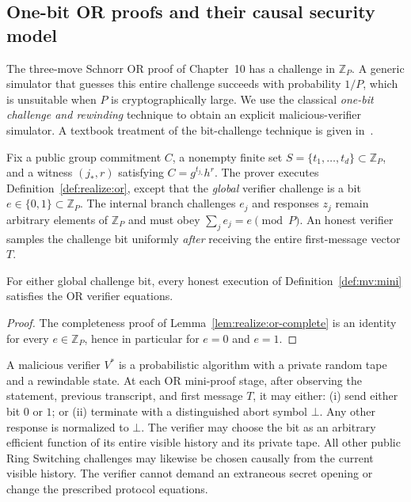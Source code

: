 \subsection{One-bit OR proofs and their causal security model}\label{sec:mv:bit}
The three-move Schnorr OR proof of Chapter~10 has a challenge
in $\mathbb Z_P$. A generic simulator that guesses this entire
challenge succeeds with probability $1/P$, which is unsuitable
when $P$ is cryptographically large. We use the classical
\emph{one-bit challenge and rewinding} technique
\cite{Schnorr1991,CramerDamgardSchoenmakers1994}
to obtain an explicit malicious-verifier simulator.
A textbook treatment of the bit-challenge technique is
given in~\cite{Goldreich2001Foundations}.

\begin{definition}\label{def:mv:mini}
Fix a public group commitment $C$, a nonempty finite set
$S=\{t_1,\dots,t_d\}\subset\mathbb Z_P$, and a witness
$(j_*,r)$ satisfying $C=g^{t_{j_*}}h^r$.
The prover executes Definition~\ref{def:realize:or},
except that the \emph{global} verifier challenge is
a bit $e\in\{0,1\}\subset\mathbb Z_P$.
The internal branch challenges $e_j$ and responses $z_j$
remain arbitrary elements of $\mathbb Z_P$ and must obey
$\sum_je_j=e\pmod P$.
An honest verifier samples the challenge bit uniformly
\emph{after} receiving the entire first-message vector $T$.
\end{definition}

\begin{lemma}\label{lem:mv:mini-complete}
For either global challenge bit, every honest execution
of Definition~\ref{def:mv:mini} satisfies the OR verifier equations.
\end{lemma}
\begin{proof}
The completeness proof of
Lemma~\ref{lem:realize:or-complete} is an identity
for every $e\in\mathbb Z_P$, hence in particular
for $e=0$ and $e=1$.
\end{proof}

\begin{definition}\label{def:mv:verifier}
A malicious verifier $V^*$ is a probabilistic
algorithm with a private random tape and a
rewindable state. At each OR mini-proof stage,
after observing the statement, previous transcript,
and first message $T$, it may either:
(i) send either bit $0$ or $1$;
or (ii) terminate with a distinguished abort symbol $\bot$.
Any other response is normalized to $\bot$.
The verifier may choose the bit as an arbitrary efficient
function of its entire visible history and its private tape.
All other public Ring Switching challenges may likewise
be chosen causally from the current visible history.
The verifier cannot demand an extraneous secret opening
or change the prescribed protocol equations.
\end{definition}

